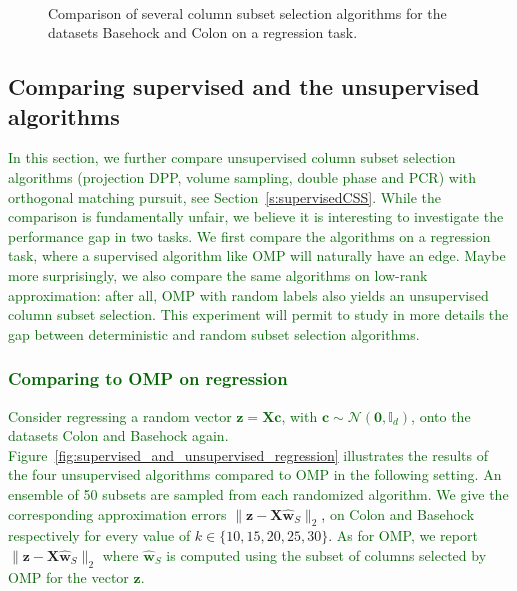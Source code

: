 \documentclass[twoside,11pt]{book}
\newcommand{\rev}[1]{\textcolor{darkgreen}{#1}}
\numberwithin{theorem}{chapter}
\numberwithin{definition}{chapter}
\numberwithin{proposition}{chapter}
\numberwithin{corollary}{chapter}
\numberwithin{example}{chapter}
\numberwithin{lemma}{chapter}
\numberwithin{assumption}{chapter}
\begin{document}
\begin{figure}
\\
\caption{Comparison of several column subset selection algorithms for the datasets Basehock and Colon on a regression task. \label{fig:unsupervised_regression}}
\end{figure}


\subsection{Comparing supervised and the unsupervised algorithms}\label{sec:num_sim_regression_2}
\rev{
In this section, we further compare unsupervised column subset selection algorithms (projection DPP, volume sampling, double phase and PCR) with orthogonal matching pursuit, see Section~\ref{s:supervisedCSS}. While the comparison is fundamentally unfair, we believe it is interesting to investigate the performance gap in two tasks. We first compare the algorithms on a regression task, where a supervised algorithm like OMP will naturally have an edge. Maybe more surprisingly, we also compare the same algorithms on low-rank approximation: after all, OMP with random labels also yields an unsupervised column subset selection. This experiment will permit to study in more details the gap between deterministic and random subset selection algorithms.
}

\rev{\subsubsection{Comparing to OMP on regression}\label{sec:num_sim_OMP_vs_CSSP_in_regression}}

\rev{Consider regressing a random vector $\mathbf{z} = \bm{X} \bm{c}$, with $\bm{c} \sim \mathcal{N}(\bm{0}, \mathbb{I}_{d})$, onto the datasets Colon and Basehock again.}
\rev{Figure~\ref{fig:supervised_and_unsupervised_regression} illustrates the results of the four unsupervised algorithms compared to OMP in the following setting.
An ensemble of 50 subsets are sampled from each randomized algorithm. We give the corresponding approximation errors} $\|\mathbf{z} - \bm{X}\hat{\bm{w}}_S\|_{2}$, \rev{on Colon and Basehock respectively for every value of} $k \in \{10,15,20,25,30\}$. \rev{As for OMP, we report} $\|\mathbf{z} - \bm{X}\hat{\bm{w}}_S\|_{2}$ \rev{where $\hat{\bm{w}}_S$ is computed using the subset of columns selected by OMP for the vector $\mathbf{z}$.}
\end{document}
